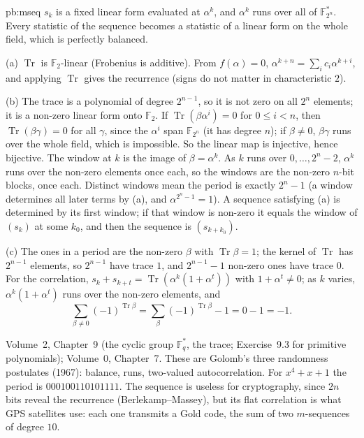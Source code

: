 \begin{solution}{pb:mseq}
\idea $s_k$ is a fixed linear form evaluated at $\alpha^k$, and $\alpha^k$ runs over all of $\mathbb F_{2^n}^*$. Every statistic
of the sequence becomes a statistic of a linear form on the whole field, which is perfectly balanced.

\writeup (a) $\operatorname{Tr}$ is $\mathbb F_2$-linear (Frobenius is additive). From $f(\alpha)=0$, $\alpha^{k+n}=\sum_ic_i\alpha^{k+i}$,
and applying $\operatorname{Tr}$ gives the recurrence (signs do not matter in characteristic $2$).

(b) The trace is a polynomial of degree $2^{n-1}$, so it is not zero on all $2^n$ elements; it is a non-zero linear form onto
$\mathbb F_2$. If $\operatorname{Tr}(\beta\alpha^i)=0$ for $0\le i<n$, then $\operatorname{Tr}(\beta\gamma)=0$ for all $\gamma$, since the
$\alpha^i$ span $\mathbb F_{2^n}$ (it has degree $n$); if $\beta\ne0$, $\beta\gamma$ runs over the whole field, which is impossible.
So the linear map is injective, hence bijective. The window at $k$ is the image of $\beta=\alpha^k$. As $k$ runs over
$0,\dots,2^n-2$, $\alpha^k$ runs over the non-zero elements once each, so the windows are the non-zero $n$-bit blocks, once each.
Distinct windows mean the period is exactly $2^n-1$ (a window determines all later terms by (a), and $\alpha^{2^n-1}=1$). A sequence
satisfying (a) is determined by its first window; if that window is non-zero it equals the window of $(s_k)$ at some $k_0$, and then
the sequence is $(s_{k+k_0})$.

(c) The ones in a period are the non-zero $\beta$ with $\operatorname{Tr}\beta=1$; the kernel of $\operatorname{Tr}$ has $2^{n-1}$
elements, so $2^{n-1}$ have trace $1$, and $2^{n-1}-1$ non-zero ones have trace $0$. For the correlation,
$s_k+s_{k+t}=\operatorname{Tr}(\alpha^k(1+\alpha^t))$ with $1+\alpha^t\ne0$; as $k$ varies, $\alpha^k(1+\alpha^t)$ runs over the
non-zero elements, and
\[
\sum_{\beta\ne0}(-1)^{\operatorname{Tr}\beta}=\sum_\beta(-1)^{\operatorname{Tr}\beta}-1=0-1=-1.
\]

\tools Volume~2, Chapter~9 (the cyclic group $\mathbb F_q^*$, the trace; Exercise~9.3 for primitive polynomials); Volume~0, Chapter~7.
\leads These are Golomb's three randomness postulates (1967): balance, runs, two-valued autocorrelation. For $x^4+x+1$ the period is
$000100110101111$. The sequence is useless for cryptography, since $2n$ bits reveal the recurrence (Berlekamp--Massey), but its
flat correlation is what GPS satellites use: each one transmits a Gold code, the sum of two $m$-sequences of degree $10$.
\end{solution}

